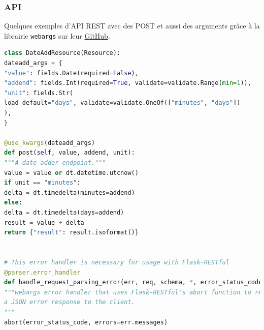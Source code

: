 \documentclass{beamer}
\begin{document}
    \begin{frame}[fragile]
        \transdissolve
        \frametitle{API}
        Quelques exemples d'API REST avec des POST et aussi des arguments grâce à la librairie \lstinline{webargs} sur leur \href{https://github.com/marshmallow-code/webargs/blob/dev/examples/flaskrestful_example.py}{GitHub}.
        \begin{lstlisting}[language=python,basicstyle=\ttfamily\tiny]
class DateAddResource(Resource):
dateadd_args = {
"value": fields.Date(required=False),
"addend": fields.Int(required=True, validate=validate.Range(min=1)),
"unit": fields.Str(
load_default="days", validate=validate.OneOf(["minutes", "days"])
),
}

@use_kwargs(dateadd_args)
def post(self, value, addend, unit):
"""A date adder endpoint."""
value = value or dt.datetime.utcnow()
if unit == "minutes":
delta = dt.timedelta(minutes=addend)
else:
delta = dt.timedelta(days=addend)
result = value + delta
return {"result": result.isoformat()}


# This error handler is necessary for usage with Flask-RESTful
@parser.error_handler
def handle_request_parsing_error(err, req, schema, *, error_status_code, error_headers):
"""webargs error handler that uses Flask-RESTful's abort function to return
a JSON error response to the client.
"""
abort(error_status_code, errors=err.messages)
        \end{lstlisting}
    \end{frame}
\end{document}
